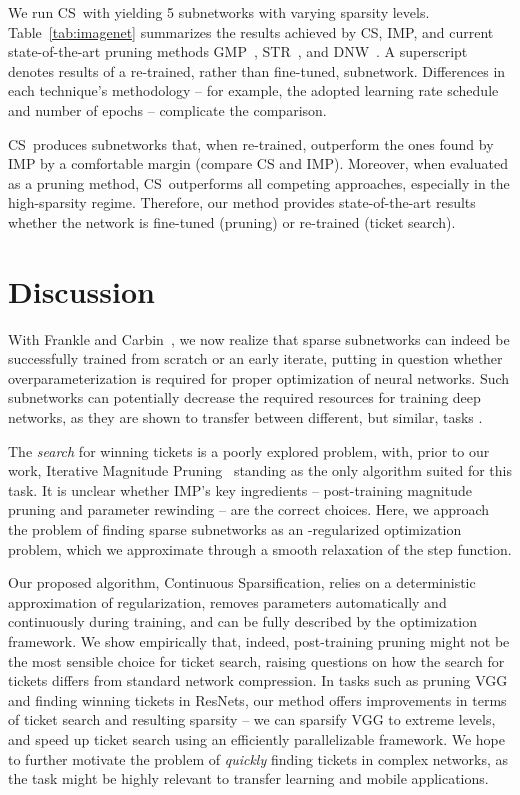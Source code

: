 \documentclass{article}
\newcommand{\citep}[1]{\cite{#1}}
\newcommand{\citet}[1]{\cite{#1}}
\newcommand{\method}{Continuous Sparsification}
\newcommand{\methodacro}{CS}
\begin{document}
We run \methodacro~with  yielding 5 subnetworks with varying sparsity levels. Table~\ref{tab:imagenet} summarizes the results achieved by \methodacro, IMP, and current state-of-the-art pruning methods GMP~\cite{gmp}, STR~\cite{softweight}, and DNW~\cite{dnw}. A  superscript denotes results of a re-trained, rather than fine-tuned, subnetwork. Differences in each technique's methodology -- for example, the adopted learning rate schedule and number of epochs -- complicate the comparison.

\methodacro~produces subnetworks that, when re-trained, outperform the ones found by IMP by a comfortable margin (compare CS and IMP). Moreover, when evaluated as a pruning method, \methodacro~outperforms all competing approaches, especially in the high-sparsity regime. Therefore, our method provides state-of-the-art results whether the network is fine-tuned (pruning) or re-trained (ticket search).
 \section{Discussion}

With Frankle and Carbin~\citet{lth}, we now realize that sparse subnetworks can indeed be successfully trained from scratch or an early iterate, putting in question whether overparameterization is required for proper optimization of neural networks. Such subnetworks can potentially decrease the required resources for training deep networks, as they are shown to transfer between different, but similar, tasks \citep{transfertickets, transtickets2}.

The \textit{search} for winning tickets is a poorly explored problem, with, prior to our work, Iterative Magnitude Pruning~\citep{lth} standing as the only algorithm suited for this task. It is unclear whether IMP's key ingredients -- post-training magnitude pruning and parameter rewinding -- are the correct choices. Here, we approach the problem of finding sparse subnetworks as an -regularized optimization problem, which we approximate through a smooth relaxation of the step function.

Our proposed algorithm, \method, relies on a deterministic approximation of  regularization, removes parameters automatically and continuously during training, and can be fully described by the optimization framework. We show empirically that, indeed, post-training pruning might not be the most sensible choice for ticket search, raising questions on how the search for tickets differs from standard network compression. In tasks such as pruning VGG and finding winning tickets in ResNets, our method offers improvements in terms of ticket search and resulting sparsity -- we can sparsify VGG to extreme levels, and speed up ticket search using an efficiently parallelizable framework. We hope to further motivate the problem of \textit{quickly} finding tickets in complex networks, as the task might be highly relevant to transfer learning and mobile applications.
\end{document}
